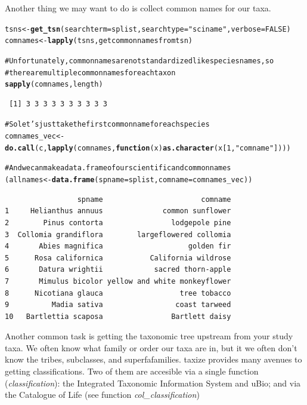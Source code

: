 \documentclass[letterpaper,superscriptaddress,showkeys,longbibliography,10pt]{revtex4-1}\usepackage{graphicx, color}
\makeatletter
\newcommand{\hlfunctioncall}[1]{\textcolor[rgb]{0.501960784313725,0,0.329411764705882}{\textbf{#1}}}%
\newcommand{\hlstring}[1]{\textcolor[rgb]{0.6,0.6,1}{#1}}%
\newcommand{\hlcomment}[1]{\textcolor[rgb]{0.180392156862745,0.6,0.341176470588235}{#1}}%
\newenvironment{kframe}{%
 \def\at@end@of@kframe{}%
 \ifinner\ifhmode%
  \def\at@end@of@kframe{\end{minipage}}%
  \begin{minipage}{\columnwidth}%
 \fi\fi%
 \def\FrameCommand##1{\hskip\@totalleftmargin \hskip-\fboxsep
 \colorbox{shadecolor}{##1}\hskip-\fboxsep
     \hskip-\linewidth \hskip-\@totalleftmargin \hskip\columnwidth}%
 \MakeFramed {\advance\hsize-\width
   \@totalleftmargin\z@ \linewidth\hsize
   \@setminipage}}%
 {\par\unskip\endMakeFramed%
 \at@end@of@kframe}
\newenvironment{knitrout}{}{} %
\makeatother
\begin{document}
Another thing we may want to do is collect common names for our taxa. 

\begin{knitrout}
\color{fgcolor}\begin{kframe}
\begin{alltt}
tsns <- \hlfunctioncall{get_tsn}(searchterm = splist, searchtype = \hlstring{"sciname"}, verbose = FALSE)
comnames <- \hlfunctioncall{lapply}(tsns, getcommonnamesfromtsn)

\hlcomment{# Unfortunately, common names are not standardized like species names, so}
\hlcomment{# there are multiple common names for each taxon}
\hlfunctioncall{sapply}(comnames, length)
\end{alltt}
\begin{verbatim}
 [1] 3 3 3 3 3 3 3 3 3 3
\end{verbatim}
\begin{alltt}

\hlcomment{# So let's just take the first common name for each species}
comnames_vec <- \hlfunctioncall{do.call}(c, \hlfunctioncall{lapply}(comnames, \hlfunctioncall{function}(x) \hlfunctioncall{as.character}(x[1, \hlstring{"comname"}])))

\hlcomment{# And we can make a data.frame of our scientific and common names}
(allnames <- \hlfunctioncall{data.frame}(spname = splist, comname = comnames_vec))
\end{alltt}
\begin{verbatim}
                 spname                       comname
1     Helianthus annuus              common sunflower
2        Pinus contorta                lodgepole pine
3  Collomia grandiflora        largeflowered collomia
4       Abies magnifica                    golden fir
5      Rosa californica           California wildrose
6       Datura wrightii            sacred thorn-apple
7       Mimulus bicolor yellow and white monkeyflower
8      Nicotiana glauca                  tree tobacco
9          Madia sativa                 coast tarweed
10   Bartlettia scaposa                Bartlett daisy
\end{verbatim}
\end{kframe}
\end{knitrout}


Another common task is getting the taxonomic tree upstream from your study taxa. We often know what family or order our taxa are in, but it we often don't know the tribes, subclasses, and superfafamilies. taxize provides many avenues to getting classifications. Two of them are accesible via a single function (\emph{classification}): the Integrated Taxonomic Information System and uBio; and via the Catalogue of Life (see function \emph{col\_classification})
\end{document}
